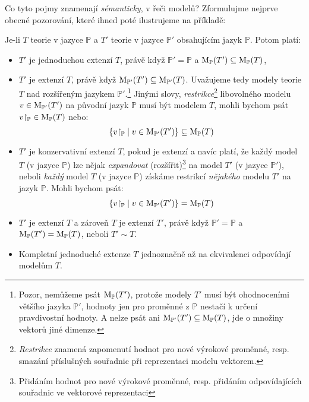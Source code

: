 Co tyto pojmy znamenají \emph{sémanticky}, v řeči modelů? Zformulujme nejprve obecné pozorování, které ihned poté ilustrujeme na příkladě:
\begin{observation}\label{observation:extensions-semantic-description-propositional}
    Je-li $T$ teorie v jazyce $\mathbb P$ a $T'$ teorie v jazyce $\mathbb P'$ obsahujícím jazyk $\mathbb P$. Potom platí:
    \begin{itemize}
        \item $T'$ je jednoduchou extenzí $T$, právě když $\mathbb P'=\mathbb P$ a $\operatorname{M}_\mathbb P(T')\subseteq\operatorname{M}_\mathbb P(T)$,
        \item $T'$ je extenzí $T$, právě když $\operatorname{M}_{\mathbb P'}(T')\subseteq\operatorname{M}_{\mathbb P'}(T)$. Uvažujeme tedy modely teorie $T$ nad rozšířeným jazykem $\mathbb P'$.\footnote{Pozor, nemůžeme psát $\operatorname{M}_\mathbb P(T')$, protože modely $T'$ musí být ohodnoceními většího jazyka $\mathbb P'$, hodnoty jen pro proměnné z $\mathbb P$ nestačí k určení pravdivostní hodnoty. A nelze psát ani $\operatorname{M}_{\mathbb P'}(T')\subseteq\operatorname{M}_{\mathbb P}(T)$, jde o množiny vektorů jiné dimenze.} Jinými slovy, \emph{restrikce}\footnote{\emph{Restrikce} znamená zapomenutí hodnot pro nové výrokové proměnné, resp. smazání příslušných souřadnic při reprezentaci modelu vektorem.} libovolného modelu $v\in\operatorname{M}_{\mathbb P'}(T')$ na původní jazyk $\mathbb P$ musí být modelem $T$, mohli bychom psát $v{\restriction_\mathbb P}\in\operatorname{M}_\mathbb P(T)$ nebo:
        $$
        \{v{\restriction_\mathbb P}\mid v\in\operatorname{M}_{\mathbb P'}(T')\}\subseteq\operatorname{M}_\mathbb P(T)
        $$
        \item $T'$ je konzervativní extenzí $T$, pokud je extenzí a navíc platí, že každý model $T$ (v jazyce $\mathbb P$) lze nějak \emph{expandovat} (rozšířit)\footnote{Přidáním hodnot pro nové výrokové proměnné, resp. přidáním odpovídajících souřadnic ve vektorové reprezentaci} na model $T'$ (v jazyce $\mathbb P'$), neboli \emph{každý} model $T$ (v jazyce $\mathbb P$) získáme restrikcí \emph{nějakého} modelu $T'$ na jazyk $\mathbb P$. Mohli bychom psát:
        $$
        \{v{\restriction_\mathbb P}\mid v\in\operatorname{M}_      {\mathbb P'}(T')\}=\operatorname{M}_\mathbb P(T)
        $$
        \item $T'$ je extenzí $T$ a zároveň $T$ je extenzí $T'$, právě když $\mathbb P'=\mathbb P$ a $\operatorname{M}_\mathbb P(T')=\operatorname{M}_\mathbb P(T)$, neboli $T'\sim T$.        
        \item Kompletní jednoduché extenze $T$ jednoznačně až na ekvivalenci odpovídají modelům $T$.
    \end{itemize}
\end{observation}

